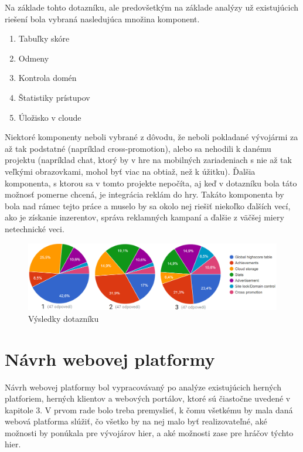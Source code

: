 Na základe tohto dotazníku, ale predovšetkým na základe analýzy už existujúcich riešení bola vybraná nasledujúca množina komponent.
\begin{enumerate}
\item Tabuľky skóre
\item Odmeny
\item Kontrola domén
\item Štatistiky prístupov
\item Úložisko v cloude
\end{enumerate}
Niektoré komponenty neboli vybrané z dôvodu, že neboli pokladané vývojármi za až tak podstatné (napríklad cross-promotion), alebo sa nehodili k danému projektu (napríklad chat, ktorý by v hre na mobilných zariadeniach s nie až tak veľkými obrazovkami, mohol byť viac na obtiaž, než k úžitku). Ďalšia komponenta, s ktorou sa v tomto projekte nepočíta, aj keď v dotazníku bola táto možnosť pomerne chcená, je integrácia reklám do hry. Takáto komponenta by bola nad rámec tejto práce a muselo by sa okolo nej riešiť niekoľko ďalších vecí, ako je získanie inzerentov, správa reklamných kampaní a ďalšie z väčšej miery netechnické veci.
\begin{figure}[h]
  \centering
  \includegraphics[scale=0.4]{fig/graf-dotazniku.png}
  \caption{Výsledky dotazníku}
  \label{fig:dotaznik}
\end{figure}

\section{Návrh webovej platformy}
Návrh webovej platformy bol vypracovávaný po analýze existujúcich herných platforiem, herných klientov a webových portálov, ktoré sú čiastočne uvedené v kapitole 3. V prvom rade bolo treba premyslieť, k čomu všetkému by mala daná webová platforma slúžiť, čo všetko by na nej malo byť realizovateľné, aké možnosti by ponúkala pre vývojárov hier, a aké možnosti zase pre hráčov týchto hier.

